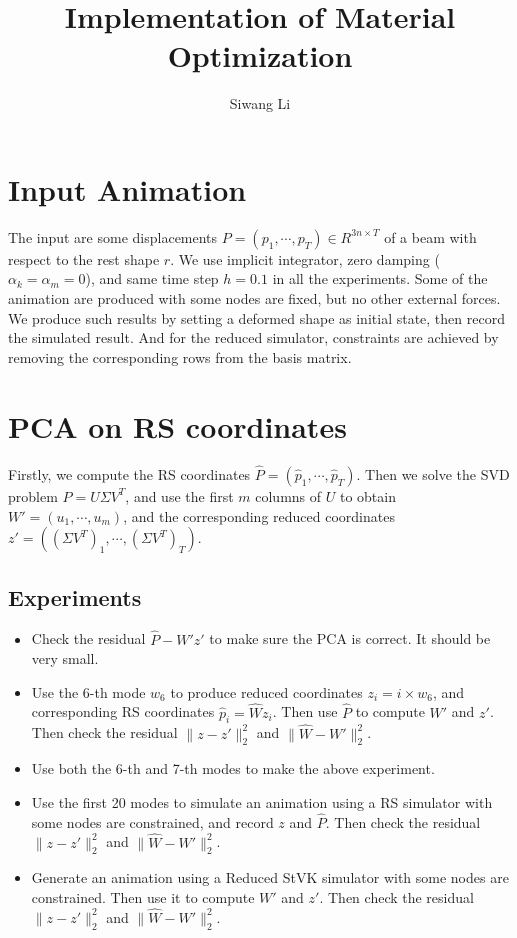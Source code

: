 \documentclass[twocolumn,a4paper]{article}
\author{Siwang Li}
\title{Implementation of Material Optimization}
\begin{document}
\maketitle

\section{Input Animation}
The input are some displacements $P = (p_1,\cdots,p_T) \in R^{3n\times T}$ of a
beam with respect to the rest shape $r$. We use implicit integrator, zero
damping ($\alpha_k=\alpha_m=0$), and same time step $h=0.1$ in all the
experiments. Some of the animation are produced with some nodes are fixed, but
no other external forces. We produce such results by setting a deformed shape as
initial state, then record the simulated result. And for the reduced simulator,
constraints are achieved by removing the corresponding rows from the basis
matrix.

\section{PCA on RS coordinates}
Firstly, we compute the RS coordinates $\hat{P} =
(\hat{p}_1,\cdots,\hat{p}_T)$.  Then we solve the SVD problem $\hat{P} = U\Sigma
V^T$, and use the first $m$ columns of $U$ to obtain $W' = (u_1,\cdots,u_m)$,
and the corresponding reduced coordinates $z' = ((\Sigma V^T)_1,\cdots,(\Sigma
V^T)_T)$.

\subsection{Experiments}
\begin{itemize}
\item Check the residual $\hat{P}-W'z'$ to make sure the PCA is correct. It
  should be very small.
\item Use the 6-th mode $w_6$ to produce reduced coordinates $z_i=i\times w_6$,
  and corresponding RS coordinates $\hat{p}_i=\hat{W}z_i$. Then use $\hat{P}$ to
  compute $W'$ and $z'$. Then check the residual $\|z-z'\|_2^2$ and
  $\|\hat{W}-W'\|_2^2$.
\item Use both the 6-th and 7-th modes to make the above experiment. 
\item Use the first 20 modes to simulate an animation using a RS simulator with
  some nodes are constrained, and record $z$ and $\hat{P}$. Then check the
  residual $\|z-z'\|_2^2$ and $\|\hat{W}-W'\|_2^2$.
\item Generate an animation using a Reduced StVK simulator with some nodes are
  constrained. Then use it to compute $W'$ and $z'$. Then check the residual
  $\|z-z'\|_2^2$ and $\|\hat{W}-W'\|_2^2$.
\end{itemize}
\end{document}
